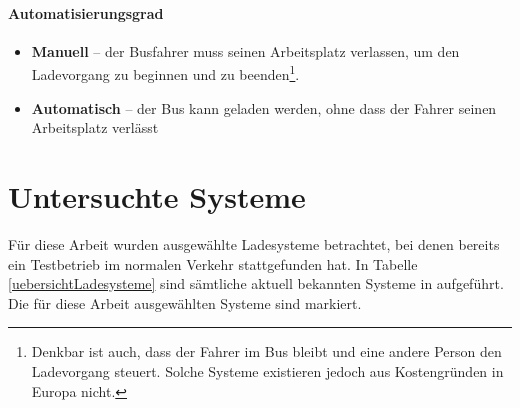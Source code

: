 \paragraph{Automatisierungsgrad}
\begin{itemize}
	\item \textbf{Manuell} – der Busfahrer muss seinen Arbeitsplatz verlassen, um den Ladevorgang zu beginnen und zu beenden\footnote{Denkbar ist auch, dass der Fahrer im Bus bleibt und eine andere Person den Ladevorgang steuert. Solche Systeme existieren jedoch aus Kostengründen in Europa nicht.}.
	\item \textbf{Automatisch} – der Bus kann geladen werden, ohne dass der Fahrer seinen Arbeitsplatz verlässt
\end{itemize}

\section{Untersuchte Systeme}
\label{untersuchte_Systeme}
Für diese Arbeit wurden ausgewählte Ladesysteme betrachtet, bei denen bereits ein Testbetrieb im normalen Verkehr stattgefunden hat. In Tabelle \ref{uebersichtLadesysteme} sind sämtliche aktuell bekannten Systeme in aufgeführt. Die für diese Arbeit ausgewählten Systeme sind markiert.

